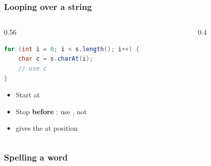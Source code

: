 \documentclass[aspectratio=169,10pt,compress]{beamer}
\begin{document}
\begin{frame}[t,fragile] \frametitle{Looping over a string}
  \begin{columns}[T]
    \begin{column}{0.56\textwidth}


\begin{lstlisting}[style=codesnippet, language=Java]
for (int i = 0; i < s.length(); i++) {
    char c = s.charAt(i);
    // use c
}
\end{lstlisting}



      \begin{itemize}\small
		\item Start at 
		
		\item Stop \textbf{before} : use \hCode{<}, not \hCode{<=}
		
		\item {} gives the  at position 
      \end{itemize}
    \end{column}
    \begin{column}{0.4\textwidth}
      \begin{center}
      \end{center}
    \end{column}
  \end{columns}
\end{frame}




\begin{frame}[t,fragile] \frametitle{Spelling a word}
\end{frame}
\end{document}
